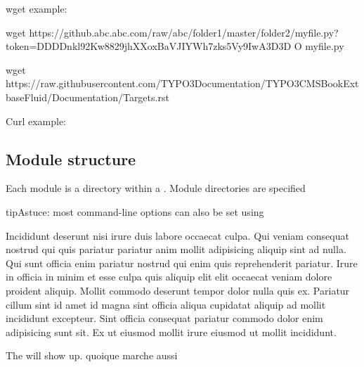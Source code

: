 \documentclass[a4paper,10pt,french]{sphinxmanual}
\begin{document}
wget example:

\begin{sphinxVerbatim}[commandchars=\\\{\}]
wget https://github.abc.abc.com/raw/abc/folder1/master/folder2/myfile.py?token=DDDDnkl92Kw8829jhXXoxBaVJIYW\PYGZhy{}h7zks5Vy9I\PYGZhy{}wA\PYGZpc{}3D\PYGZpc{}3D \PYGZhy{}O myfile.py

wget https://raw.githubusercontent.com/TYPO3\PYGZhy{}Documentation/TYPO3CMS\PYGZhy{}Book\PYGZhy{}ExtbaseFluid/Documentation/Targets.rst
\end{sphinxVerbatim}

Curl example:

\begin{sphinxVerbatim}[commandchars=\\\{\}]
   
\end{sphinxVerbatim}


\subsection{Module structure}
\label{\detokenize{docs/tuts/autocad-tut01:module-structure}}
Each module is a directory within a . Module directories
are specified

\begin{sphinxadmonition}{tip}{Astuce:}
most command-line options can also be set using
\end{sphinxadmonition}

Incididunt deserunt nisi irure duis labore occaecat culpa. Qui veniam consequat nostrud qui quis pariatur pariatur anim mollit adipisicing aliquip sint ad nulla. Qui sunt officia enim pariatur nostrud qui enim quis reprehenderit pariatur. Irure in officia in minim et esse culpa quis aliquip elit elit occaecat veniam dolore proident aliquip. Mollit commodo deserunt tempor dolor nulla quis ex. Pariatur cillum sint id amet id magna sint officia aliqua cupidatat aliquip ad mollit incididunt excepteur. Sint officia consequat pariatur commodo dolor enim adipisicing sunt sit. Ex ut eiusmod mollit irure eiusmod ut mollit incididunt.

The  will show up. quoique  marche aussi
\end{document}
